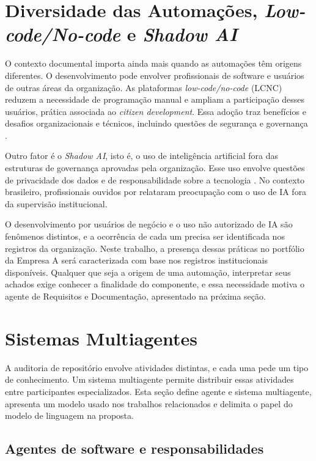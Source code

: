 \section{Diversidade das Automações, \textit{Low-code/No-code} e \textit{Shadow AI}}
\label{rt-2-2}

O contexto documental importa ainda mais quando as automações têm origens diferentes. O desenvolvimento pode envolver profissionais de software e usuários de outras áreas da organização. As plataformas \textit{low-code/no-code} (LCNC) reduzem a necessidade de programação manual e ampliam a participação desses usuários, prática associada ao \textit{citizen development}. Essa adoção traz benefícios e desafios organizacionais e técnicos, incluindo questões de segurança e governança \cite{ajimati2025}.

Outro fator é o \textit{Shadow AI}, isto é, o uso de inteligência artificial fora das estruturas de governança aprovadas pela organização. Esse uso envolve questões de privacidade dos dados e de responsabilidade sobre a tecnologia \cite{silic2025}. No contexto brasileiro, profissionais ouvidos por  relataram preocupação com o uso de IA fora da supervisão institucional.

O desenvolvimento por usuários de negócio e o uso não autorizado de IA são fenômenos distintos, e a ocorrência de cada um precisa ser identificada nos registros da organização. Neste trabalho, a presença dessas práticas no portfólio da Empresa A será caracterizada com base nos registros institucionais disponíveis. Qualquer que seja a origem de uma automação, interpretar seus achados exige conhecer a finalidade do componente, e essa necessidade motiva o agente de Requisitos e Documentação, apresentado na próxima seção.

\section{Sistemas Multiagentes}
\label{rt-2-3}

A auditoria de repositório envolve atividades distintas, e cada uma pede um tipo de conhecimento. Um sistema multiagente permite distribuir essas atividades entre participantes especializados. Esta seção define agente e sistema multiagente, apresenta um modelo usado nos trabalhos relacionados e delimita o papel do modelo de linguagem na proposta.

\subsection{Agentes de software e responsabilidades}
\label{rt-2-3-1}

